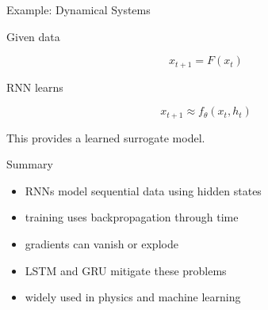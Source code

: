 \documentclass{beamer}
\begin{document}
\begin{frame}{Example: Dynamical Systems}

Given data

\[
x_{t+1} = F(x_t)
\]

RNN learns

\[
x_{t+1} \approx f_\theta(x_t,h_t)
\]

This provides a learned surrogate model.
\end{frame}

\begin{frame}{Summary}

\begin{itemize}
\item RNNs model sequential data using hidden states
\item training uses backpropagation through time
\item gradients can vanish or explode
\item LSTM and GRU mitigate these problems
\item widely used in physics and machine learning
\end{itemize}

\end{frame}
\end{document}
